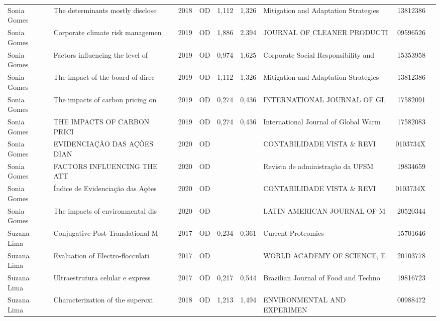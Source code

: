 \documentclass[12pt,brazil]{article}\usepackage[]{graphicx}\usepackage[]{xcolor}
\begin{document}
\begin{longtable}{lllrrllrr}
Sonia Gomes & The determinants mostly disclose & 2018 & OD & 1,112 & 1,326 & Mitigation and Adaptation Strategies & 13812386 \\
Sonia Gomes & Corporate climate risk managemen & 2019 & OD & 1,886 & 2,394 & JOURNAL OF CLEANER PRODUCTI & 09596526 \\
Sonia Gomes & Factors influencing the level of & 2019 & OD & 0,974 & 1,625 & Corporate Social Responsibility and  & 15353958 \\
Sonia Gomes & The impact of the board of direc & 2019 & OD & 1,112 & 1,326 & Mitigation and Adaptation Strategies & 13812386 \\
Sonia Gomes & The impacts of carbon pricing on & 2019 & OD & 0,274 & 0,436 & INTERNATIONAL JOURNAL OF GL & 17582091 \\
Sonia Gomes & THE IMPACTS OF CARBON PRICI & 2019 & OD & 0,274 & 0,436 & International Journal of Global Warm & 17582083 \\
\rowcolor{coautr}\rowcolor{coautr}\rowcolor{coautr}\rowcolor{coautr}\rowcolor{coautr}\rowcolor{coautr}\rowcolor{coautr}\rowcolor{coautr}\rowcolor{coautr}\rowcolor{coautr}\rowcolor{coautr}\rowcolor{coautr}\rowcolor{coautr}\rowcolor{coautr}\rowcolor{coautr}\rowcolor{coautr}Sonia Gomes & EVIDENCIAÇÃO DAS AÇÕES DIAN & 2020 & OD &  &  & CONTABILIDADE VISTA \& REVI & 0103734X \\
Sonia Gomes & FACTORS INFLUENCING THE ATT & 2020 & OD &  &  & Revista de administração da UFSM & 19834659 \\
\rowcolor{coautr}\rowcolor{coautr}\rowcolor{coautr}\rowcolor{coautr}\rowcolor{coautr}\rowcolor{coautr}\rowcolor{coautr}\rowcolor{coautr}\rowcolor{coautr}\rowcolor{coautr}\rowcolor{coautr}\rowcolor{coautr}\rowcolor{coautr}\rowcolor{coautr}\rowcolor{coautr}\rowcolor{coautr}Sonia Gomes & Índice de Evidenciação das Ações & 2020 & OD &  &  & CONTABILIDADE VISTA \& REVI & 0103734X \\
Sonia Gomes & The impacts of environmental dis & 2020 & OD &  &  & LATIN AMERICAN JOURNAL OF M & 20520344 \\
Suzana Lima & Conjugative Post-Translational M & 2017 & OD & 0,234 & 0,361 & Current Proteomics & 15701646 \\
Suzana Lima & Evaluation of Electro-flocculati & 2017 & OD &  &  & WORLD ACADEMY OF SCIENCE, E & 20103778 \\
Suzana Lima & Ultraestrutura celular e express & 2017 & OD & 0,217 & 0,544 & Brazilian Journal of Food and Techno & 19816723 \\
\rowcolor{coautr}\rowcolor{coautr}\rowcolor{coautr}\rowcolor{coautr}\rowcolor{coautr}\rowcolor{coautr}\rowcolor{coautr}\rowcolor{coautr}\rowcolor{coautr}\rowcolor{coautr}\rowcolor{coautr}\rowcolor{coautr}\rowcolor{coautr}\rowcolor{coautr}\rowcolor{coautr}\rowcolor{coautr}Suzana Lima & Characterization of the superoxi & 2018 & OD & 1,213 & 1,494 & ENVIRONMENTAL AND EXPERIMEN & 00988472 \\

\end{longtable}
\end{document}

